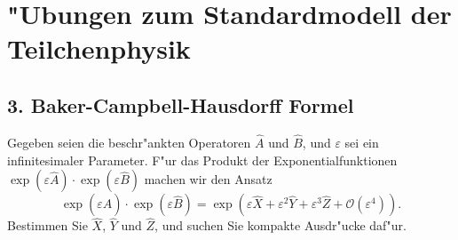 \documentclass[10pt,a4paper]{article}
\begin{document}
\section*{"Ubungen zum Standardmodell der Teilchenphysik}
\subsection*{3. Baker-Campbell-Hausdorff Formel}
Gegeben seien die beschr"ankten Operatoren $\hat{A}$ und $\hat{B}$, und $\varepsilon$ sei ein infinitesimaler Parameter.
F"ur das Produkt der Exponentialfunktionen $\exp(\varepsilon \hat{A}) \cdot \exp(\varepsilon \hat{B})$ machen wir den Ansatz
\[\exp(\varepsilon \hat{A})\cdot \exp(\varepsilon \hat{B}) = \exp(\varepsilon \hat{X} + \varepsilon^2\hat{Y} + \varepsilon^3\hat{Z} + \mathcal{O}(\varepsilon^4)).\]
Bestimmen Sie $\hat{X}$, $\hat{Y}$ und $\hat{Z}$, und suchen Sie kompakte Ausdr"ucke daf"ur.
\end{document}
